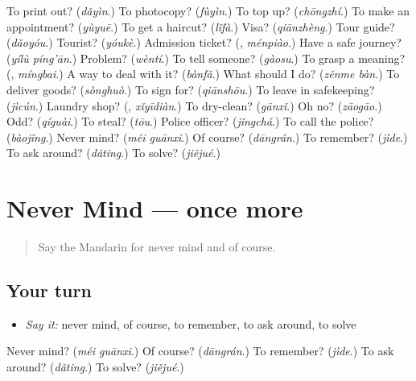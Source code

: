 \begin{tcolorbox}[breakable,colback=teal!4,colframe=teal!35!black,title={Before you move on}]
To print out? (\emph{dǎyìn}.) To photocopy? (\emph{fùyìn}.) To top up? (\emph{chōngzhí}.) To make an appointment? (\emph{yùyuē}.) To get a haircut? (\emph{lǐfà}.) Visa? (\emph{qiānzhèng}.) Tour guide? (\emph{dǎoyóu}.) Tourist? (\emph{yóukè}.) Admission ticket? (\textbf{}, \emph{ménpiào}.) Have a safe journey? (\emph{yílù píng'ān}.) Problem? (\emph{wèntí}.) To tell someone? (\emph{gàosu}.) To grasp a meaning? (\textbf{}, \emph{míngbai}.) A way to deal with it? (\emph{bànfǎ}.) What should I do? (\emph{zěnme bàn}.) To deliver goods? (\emph{sònghuò}.) To sign for? (\emph{qiānshōu}.) To leave in safekeeping? (\emph{jìcún}.) Laundry shop? (\textbf{}, \emph{xǐyīdiàn}.) To dry-clean? (\emph{gānxǐ}.) Oh no? (\emph{zāogāo}.) Odd? (\emph{qíguài}.) To steal? (\emph{tōu}.) Police officer? (\emph{jǐngchá}.) To call the police? (\emph{bàojǐng}.) Never mind? (\emph{méi guānxi}.) Of course? (\emph{dāngrán}.) To remember? (\emph{jìde}.) To ask around? (\emph{dǎting}.) To solve? (\emph{jiějué}.)
\end{tcolorbox}
\section[(dialogue)]{Never Mind — once more}

\label{lesson:ZH-R217-review-final-217}



\begin{quote}
Say the Mandarin for never mind and of course.
\end{quote}

\subsection*{Your turn}
\begin{itemize}
\raggedright
  \item \emph{Say it:} never mind, of course, to remember, to ask around, to solve
\end{itemize}

\begin{tcolorbox}[breakable,colback=teal!4,colframe=teal!35!black,title={Before you move on}]
Never mind? (\emph{méi guānxi}.) Of course? (\emph{dāngrán}.) To remember? (\emph{jìde}.) To ask around? (\emph{dǎting}.) To solve? (\emph{jiějué}.)
\end{tcolorbox}
